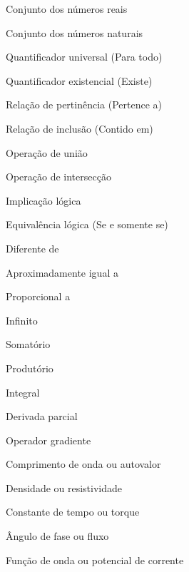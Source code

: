 \begin{simbolos}
  \item[$\mathbb{R}$] Conjunto dos números reais
  \item[$\mathbb{N}$] Conjunto dos números naturais
  \item[$\forall$] Quantificador universal (Para todo)
  \item[$\exists$] Quantificador existencial (Existe)
  \item[$\in$] Relação de pertinência (Pertence a)
  \item[$\subset$] Relação de inclusão (Contido em)
  \item[$\cup$] Operação de união
  \item[$\cap$] Operação de intersecção

  \item[$\implies$] Implicação lógica
  \item[$\iff$] Equivalência lógica (Se e somente se)
  \item[$\neq$] Diferente de
  \item[$\approx$] Aproximadamente igual a
  \item[$\propto$] Proporcional a
  \item[$\infty$] Infinito

  \item[$\sum$] Somatório
  \item[$\prod$] Produtório
  \item[$\int$] Integral
  \item[$\partial$] Derivada parcial
  \item[$\nabla$] Operador gradiente

  \item[$\lambda$] Comprimento de onda ou autovalor
  \item[$\rho$] Densidade ou resistividade
  \item[$\tau$] Constante de tempo ou torque
  \item[$\phi$] Ângulo de fase ou fluxo
  \item[$\psi$] Função de onda ou potencial de corrente
\end{simbolos}